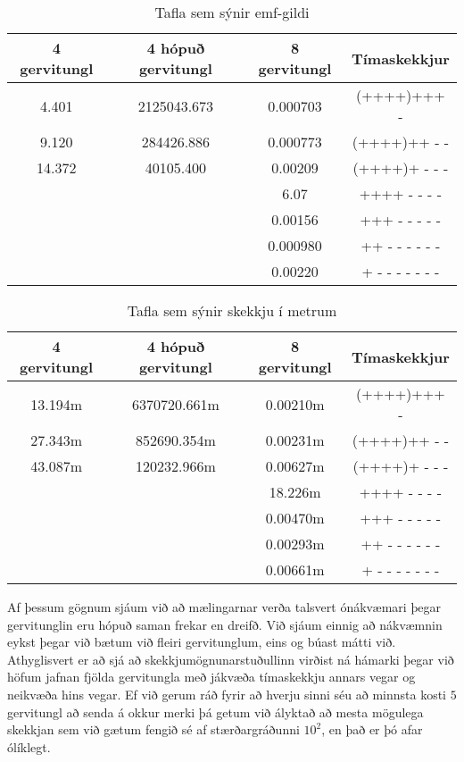 \documentclass[11pt]{article}
\begin{document}
\begin{table}[H]
\caption{Tafla sem sýnir emf-gildi}
\begin{center}
	\begin{tabular}{c|c|c|c}
    	4 gervitungl & 4 hópuð gervitungl & 8 gervitungl & Tímaskekkjur\\
        \hline
        4.401 & 2125043.673 & 0.000703 & (++++)+++ -\\
        9.120 & 284426.886 & 0.000773 &  (++++)++ - -\\
        14.372 & 40105.400 & 0.00209 &  (++++)+ - - -\\
         &  & 6.07 & ++++ - - - - \\
         &  & 0.00156 & +++ - - - - - \\
         &  & 0.000980 & ++ - - - - - - \\
         &  & 0.00220 & + - - - - - - - \\
    \end{tabular}
\end{center}
\end{table}
\begin{table}[H]
\caption{Tafla sem sýnir skekkju í metrum}
\begin{center}
	\begin{tabular}{c|c|c|c}
    	4 gervitungl & 4 hópuð gervitungl & 8 gervitungl & Tímaskekkjur\\
        \hline
        13.194m & 6370720.661m & 0.00210m & (++++)+++ -\\
        27.343m & 852690.354m & 0.00231m &  (++++)++ - -\\
        43.087m & 120232.966m & 0.00627m &  (++++)+ - - -\\
         &  & 18.226m & ++++ - - - - \\
         &  & 0.00470m & +++ - - - - - \\
         &  & 0.00293m & ++ - - - - - - \\
         &  & 0.00661m & + - - - - - - - \\
    \end{tabular}
\end{center}
\end{table}

Af þessum gögnum sjáum við að mælingarnar verða talsvert ónákvæmari þegar gervitunglin eru hópuð saman frekar en dreifð. Við sjáum einnig að nákvæmnin eykst þegar við bætum við fleiri gervitunglum, eins og búast mátti við. Athyglisvert er að sjá að skekkjumögnunarstuðullinn virðist ná hámarki þegar við höfum jafnan fjölda gervitungla með jákvæða tímaskekkju annars vegar og neikvæða hins vegar. Ef við gerum ráð fyrir að hverju sinni séu að minnsta kosti $5$ gervitungl að senda á okkur merki þá getum við ályktað að mesta mögulega skekkjan sem við gætum fengið sé af stærðargráðunni $10^2$, en það er þó afar ólíklegt. 
\end{document}
